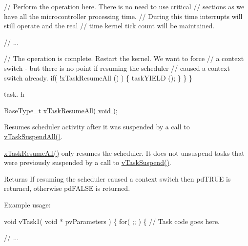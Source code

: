 \begin{DoxyPre}      // Perform the operation here.  There is no need to use critical
      // sections as we have all the microcontroller processing time.
      // During this time interrupts will still operate and the real
      // time kernel tick count will be maintained.\end{DoxyPre}



\begin{DoxyPre}      // ...\end{DoxyPre}



\begin{DoxyPre}      // The operation is complete.  Restart the kernel.  We want to force
      // a context switch - but there is no point if resuming the scheduler
      // caused a context switch already.
      if( !xTaskResumeAll () )
      \{
           taskYIELD ();
      \}
  \}
\}
\end{DoxyPre}


task. h 
\begin{DoxyPre}BaseType\_t \hyperlink{externals_2freertos_2include_2task_8h_a003f8ae6d649225abd030cc76e1c7d0e}{xTaskResumeAll( void )};\end{DoxyPre}


Resumes scheduler activity after it was suspended by a call to \hyperlink{externals_2freertos_2include_2task_8h_a366b302eba79d10b5ee2a3756f0fcc43}{v\+Task\+Suspend\+All()}.

\hyperlink{externals_2freertos_2include_2task_8h_a003f8ae6d649225abd030cc76e1c7d0e}{x\+Task\+Resume\+All()} only resumes the scheduler. It does not unsuspend tasks that were previously suspended by a call to \hyperlink{externals_2freertos_2include_2task_8h_a84d4e660b04630be2939d91b3c2412f8}{v\+Task\+Suspend()}.

\begin{DoxyReturn}{Returns}
If resuming the scheduler caused a context switch then pd\+T\+R\+UE is returned, otherwise pd\+F\+A\+L\+SE is returned.
\end{DoxyReturn}
Example usage\+: 
\begin{DoxyPre}
void vTask1( void * pvParameters )
\{
    for( ;; )
    \{
     // Task code goes here.\end{DoxyPre}



\begin{DoxyPre}     // ...\end{DoxyPre}




